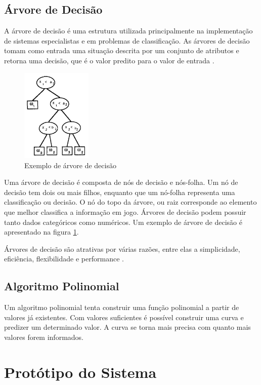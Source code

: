 \documentclass[12pt]{article}
\begin{document}
\subsection{Árvore de Decisão}\label{sec:arvorededecisao}
A árvore de decisão é uma estrutura utilizada principalmente na implementação de
sistemas especialistas e em problemas de classificação. As árvores de decisão
tomam como entrada uma situação descrita por um conjunto de atributos e retorna
uma decisão, que é o valor predito para o valor de entrada \cite{russell2003}.

\begin{figure}[h]
\centering
\includegraphics[width=0.3\textwidth]{arvorededecisao}
\caption{Exemplo de árvore de decisão \cite{safavian1991survey}}
\label{arvorededecisao}
\end{figure}

Uma árvore de decisão é composta de nós de decisão e nós-folha. Um nó de decisão
tem dois ou mais filhos, enquanto que um nó-folha representa uma classificação
ou decisão. O nó do topo da árvore, ou raiz corresponde ao elemento que melhor
classifica a informação em jogo. Árvores de decisão podem possuir tanto dados
categóricos como numéricos. Um exemplo de árvore de decisão é apresentado na
figura \ref{arvorededecisao}.

Árvores de decisão são atrativas por várias razões, entre elas a simplicidade,
eficiência, flexibilidade e performance \cite{safavian1991survey}.

\subsection{Algoritmo Polinomial}
Um algoritmo polinomial tenta construir uma função polinomial a partir de
valores já existentes. Com valores suficientes é possível construir uma curva
e predizer um determinado valor. A curva se torna mais precisa com quanto mais
valores forem informados.

\section{Protótipo do Sistema}
\end{document}
